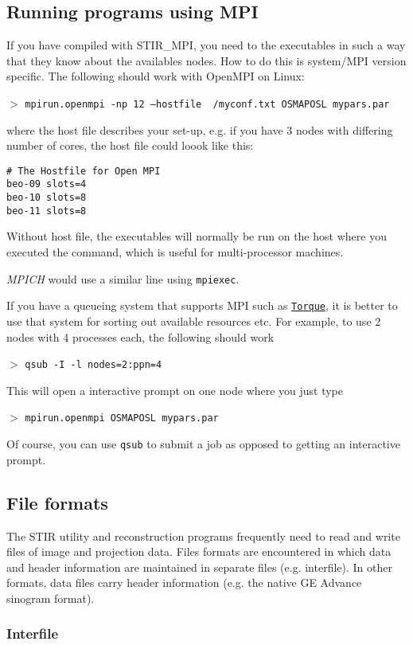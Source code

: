 \documentclass{article}
\def\R2Lurl#1#2{\mbox{\href{#1}{\tt #2}}}
\newcommand{\cmdline}[1]{\par \noindent $>$ \texttt{#1}\par}
\begin{document}
\subsection{
Running programs using MPI \label{sec:RunningWithMPI}}
If you have compiled with STIR\_MPI, you need to the executables in such a way that
they know about the availables nodes. How to do this is system/MPI version specific. The following
should work with OpenMPI on Linux:

\cmdline{mpirun.openmpi -np 12 --hostfile ~/myconf.txt OSMAPOSL mypars.par}

\noindent 
where the host file describes your set-up, e.g. if you have 3 nodes with differing number of cores, the
host file could loook like this:
\begin{verbatim}
# The Hostfile for Open MPI
beo-09 slots=4
beo-10 slots=8
beo-11 slots=8
\end{verbatim}
Without host file, the executables will normally be run on the host where you executed the command, which
is useful for multi-processor machines. 

\textit{MPICH} would use a similar line using \texttt{mpiexec}.

If you have a queueing system that supports MPI such as 
\R2Lurl{http://www.clusterresources.com/products/torque-resource-manager.php}{Torque}, it is better to use 
that system for sorting out available resources etc. For example, to use 2 nodes with 4 processes each,
the following should work

\cmdline{qsub -I -l nodes=2:ppn=4}

This will open a interactive prompt on one node where you just type

\cmdline{mpirun.openmpi OSMAPOSL mypars.par}

Of course, you can use \texttt{qsub} to submit a job as opposed to getting an interactive prompt.

\subsection{
File formats}

The STIR utility and reconstruction programs frequently need 
to read and write files of image and projection data. Files formats 
are encountered in which data and header information are maintained 
in separate files (e.g. interfile). In other formats, data files 
carry header information (e.g. the native GE Advance sinogram 
format).

\subsubsection{Interfile}
\end{document}
